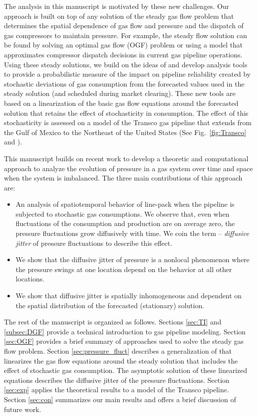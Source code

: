 \documentclass[10pt, conference, compsocconf]{IEEEtran}
\begin{document}
The analysis in this manuscript is motivated by these new challenges.  Our approach is built on top of any solution of the steady gas flow problem that determines the spatial dependence of gas flow and pressure and the dispatch of gas compressors to maintain pressure.  For example, the steady flow solution can be found by solving an optimal gas flow (OGF) problem \cite{13MFBBCP} or using a model that approximates compressor dispatch decisions in current gas pipeline operations. Using these steady solutions, we build on the ideas of \cite{14CLB} and develop analysis tools to provide a probabilistic measure of the impact on pipeline reliability created by stochastic deviations of gas consumption from the forecasted values used in the steady solution (and scheduled during market clearing). These new tools are based on a linearization of the basic gas flow equations around the forecasted solution that retains the effect of stochasticity in consumption.  The effect of this stochasticity is assessed on a model of the Transco gas pipeline that extends from the Gulf of Mexico to the Northeast of the United States (See Fig.~\ref{fig:Transco} and  \cite{13MFBBCP}).

This manuscript builds on recent work \cite{13MFBBCP,14CLB} to develop a theoretic and computational approach to analyze the evolution of pressure in a gas system over time and space when the system is imbalanced. The three main contributions of this approach are:
\begin{itemize}
\item An analysis of spatiotemporal behavior of line-pack when the pipeline is subjected to stochastic gas consumptions. We observe that, even when fluctuations of the consumption and production are on average zero, the pressure fluctuations grow diffusively with time.
We coin the term -- {\em diffusive jitter} of pressure fluctuations to describe this effect.

\item We show that the diffusive jitter of pressure is a nonlocal phenomenon where the pressure swings at one location depend on the behavior at all other locations.

\item We show that diffusive jitter is spatially inhomogeneous and dependent on the spatial distribution of the forecasted (stationary) solution.
\end{itemize}

The rest of the manuscript is organized as follows. Sections \ref{sec:TI} and \ref{subsec:DGF} provide a technical introduction to gas pipeline modeling. Section \ref{sec:OGF} provides a brief summary of approaches used to solve the steady gas flow problem. Section \ref{sec:pressure_fluct} describes a generalization of \cite{14CLB} that linearizes the gas flow equations around the steady solution that includes the effect of stochastic gas consumption.  The asymptotic solution of these linearized equations describes the diffusive jitter of the pressure fluctuations.
Section \ref{sec:exp} applies the theoretical results to a model of the Transco pipeline.  Section \ref{sec:con} summarizes our main results and offers a brief discussion of future work.
\end{document}

